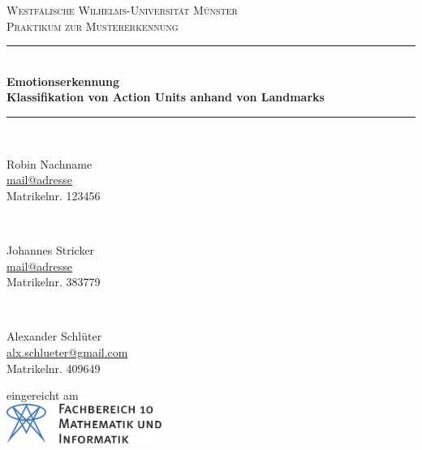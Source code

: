 \begin{titlepage}
	\newcommand{\HRule}{\rule{\linewidth}{0.5mm}} %

	\center %
 

	\textsc{\LARGE Westfälische Wilhelms-Universität Münster}\\[1.5cm] %
	\textsc{\Large Praktikum zur Mustererkennung}\\[0.5cm] %


	\HRule \\[0.4cm]
	
	{\onehalfspacing\huge\sffamily\bfseries Emotionserkennung \\[0.4cm]
    \large Klassifikation von Action Units anhand von Landmarks \singlespacing} %
	\vspace{0.4cm}
	\HRule \\[3cm] 
	
	\begin{minipage}[t]{0.3\textwidth}
	\begin{center} \large
	Robin Nachname\\ %
	\normalsize \url{mail@adresse}\\
	Matrikelnr. 123456
	\end{center}
	\end{minipage}
	~
	\begin{minipage}[t]{0.3\textwidth}
	\begin{center} \large
	Johannes Stricker\\ 
	\normalsize \url{mail@adresse}\\
	Matrikelnr. 383779
	\end{center}
	\end{minipage}
  ~
	\begin{minipage}[t]{0.3\textwidth}
	\begin{center} \large
	Alexander Schlüter\\ 
	\normalsize \url{alx.schlueter@gmail.com}\\
	Matrikelnr. 409649
	\end{center}
  \end{minipage}

  \vfill

	{\large eingereicht am \thedate}\\[3cm] %


	\includegraphics[height=1.3cm,keepaspectratio]{Bilder/fb10logo.pdf}\\[1cm] %
 

	
\end{titlepage}